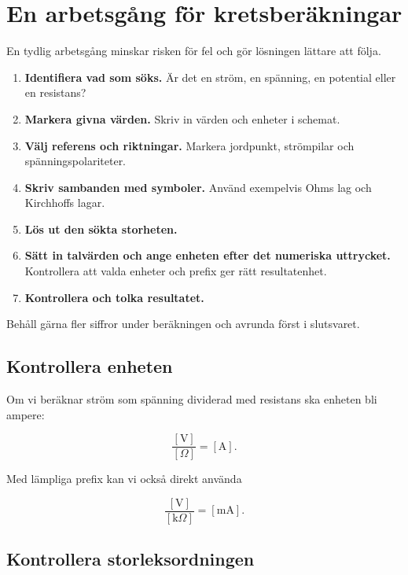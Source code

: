\documentclass[
  swedish,
  11pt,
  a4paper,
  DIV=11,
  numbers=noendperiod,
  twoside,
  open=any]{scrreprt}
\begin{document}
\section{En arbetsgång för
kretsberäkningar}\label{sec-grunder-en-arbetsgang-for-kretsberakningar}

En tydlig arbetsgång minskar risken för fel och gör lösningen lättare
att följa.

\begin{enumerate}
\def\labelenumi{\arabic{enumi}.}
\item
  \textbf{Identifiera vad som söks.} Är det en ström, en spänning, en
  potential eller en resistans?
\item
  \textbf{Markera givna värden.} Skriv in värden och enheter i schemat.
\item
  \textbf{Välj referens och riktningar.} Markera jordpunkt, strömpilar
  och spänningspolariteter.
\item
  \textbf{Skriv sambanden med symboler.} Använd exempelvis Ohms lag och
  Kirchhoffs lagar.
\item
  \textbf{Lös ut den sökta storheten.}
\item
  \textbf{Sätt in talvärden och ange enheten efter det numeriska
  uttrycket.} Kontrollera att valda enheter och prefix ger rätt
  resultatenhet.
\item
  \textbf{Kontrollera och tolka resultatet.}
\end{enumerate}

Behåll gärna fler siffror under beräkningen och avrunda först i
slutsvaret.

\subsection{Kontrollera enheten}\label{sec-grunder-kontrollera-enheten}

Om vi beräknar ström som spänning dividerad med resistans ska enheten
bli ampere:

\[
\frac{[\mathrm{V}]}{[\Omega]} = [\mathrm{A}].
\]

Med lämpliga prefix kan vi också direkt använda

\[
\frac{[\mathrm{V}]}{[\mathrm{k}\Omega]} = [\mathrm{mA}].
\]

\subsection{Kontrollera
storleksordningen}\label{sec-grunder-kontrollera-storleksordningen}
\end{document}

